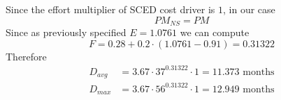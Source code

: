 Since the effort multiplier of SCED cost driver is $1$, in our case $$PM_{NS} = PM$$
Since as previously specified $E = 1.0761$ we can compute $$F = 0.28+0.2 \cdot (1.0761-0.91) = 0.31322$$
Therefore
\begin{align*}
D_{avg} &= 3.67 \cdot 37^{0.31322} \cdot 1 = 11.373 \text{ months}\\
D_{max} &= 3.67 \cdot 56^{0.31322} \cdot 1 = 12.949 \text{ months}
\end{align*}
